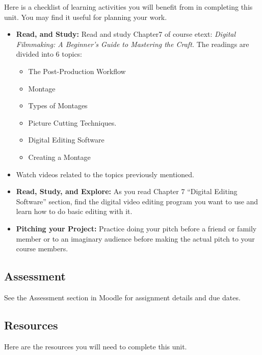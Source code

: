 \documentclass[
]{book}
\providecommand{\tightlist}{%
  \setlength{\itemsep}{0pt}\setlength{\parskip}{0pt}}
\begin{document}
\begin{reflect}
Here is a checklist of learning activities you will benefit from in completing this unit. You may find it useful for planning your work.

\begin{itemize}
\item
  \textbf{Read, and Study:} Read and study Chapter7 of course etext: \emph{Digital Filmmaking: A Beginner's Guide to Mastering the Craft.} The readings are divided into 6 topics:

  \begin{itemize}
  \tightlist
  \item
    The Post-Production Workflow
  \item
    Montage
  \item
    Types of Montages
  \item
    Picture Cutting Techniques.
  \item
    Digital Editing Software
  \item
    Creating a Montage
  \end{itemize}
\item
  Watch videos related to the topics previously mentioned.
\item
  \textbf{Read, Study, and Explore:} As you read Chapter 7 ``Digital Editing Software'' section, find the digital video editing program you want to use and learn how to do basic editing with it.
\item
  \textbf{Pitching your Project:} Practice doing your pitch before a friend or family member or to an imaginary audience before making the actual pitch to your course members.
\end{itemize}
\end{reflect}

\hypertarget{assessment-10}{%
\subsection*{Assessment}\label{assessment-10}}

See the Assessment section in Moodle for assignment details and due dates.

\hypertarget{resources-6}{%
\subsection*{Resources}\label{resources-6}}

Here are the resources you will need to complete this unit.
\end{document}
